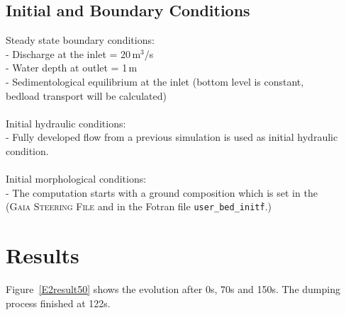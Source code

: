\subsection{Initial and Boundary Conditions}
%
Steady state boundary conditions:\\
\hspace*{3mm} - Discharge at the inlet = 20\,m$^3$/s\\
\hspace*{3mm} - Water depth at outlet = 1\,m\\
\hspace*{3mm} - Sedimentological equilibrium at the inlet (bottom level is constant,\\
\hspace*{5.3mm} bedload transport will be calculated)\\
\\
Initial hydraulic conditions:\\
\hspace*{3mm} - Fully developed flow from a previous simulation is used as initial hydraulic condition.\\
\\
Initial morphological conditions:\\
\hspace*{3mm} - The computation starts with a ground composition which is set in the \\
\hspace*{5.3mm} (\textsc{Gaia Steering File} and in the Fotran file \texttt{user\_bed\_init\.f}.)\\


\newpage
\section{Results}
%
Figure~\ref{E2result50} shows the evolution after 0s, 70s and 150s. The dumping process finished at 122s.


